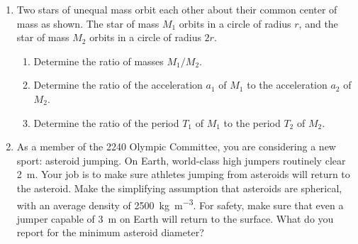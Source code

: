 \documentclass{../../../oss-apphys}
\begin{document}
\begin{enumerate}[leftmargin=15pt]
\item Two stars of unequal mass orbit each other about their common center of
  mass as shown. The star of mass $M_1$ orbits in a circle of radius $r$, and
  the star of mass $M_2$ orbits in a circle of radius $2r$.
  \begin{center}
  \end{center}
  \begin{enumerate}[noitemsep,leftmargin=20pt]
  \item Determine the ratio of masses $M_1/M_2$.
  \item Determine the ratio of the acceleration $a_1$ of $M_1$ to the
    acceleration $a_2$ of $M_2$.
  \item Determine the ratio of the period $T_1$ of $M _1$ to the period $T_2$
    of $M_2$.
  \end{enumerate}
  \vspace{2.2in}
  
\item As a member of the 2240 Olympic Committee, you are considering a new
  sport: asteroid jumping. On Earth, world-class high jumpers routinely clear
  \SI{2}{\metre}. Your job is to make sure athletes jumping from asteroids will
  return to the asteroid. Make the simplifying assumption that asteroids are
  spherical, with an average density of \SI{2500}{\kilo\gram\per\metre^3}. For
  safety, make sure that even a jumper capable of \SI{3}{\metre} on Earth will
  return to the surface. What do you report for the minimum asteroid diameter?
  \newpage


\end{enumerate}
\end{document}
